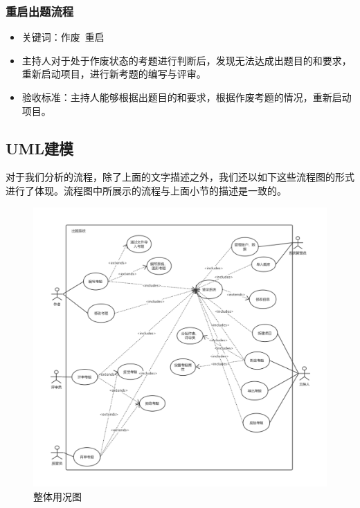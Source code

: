 \documentclass[hyperref, a4paper]{ctexart}
\begin{document}
\hypertarget{ux91cdux542fux51faux9898ux6d41ux7a0b}{%
\subsubsection{重启出题流程}\label{ux91cdux542fux51faux9898ux6d41ux7a0b}}

\begin{itemize}
\item
  关键词：作废~重启
\item
  主持人对于处于作废状态的考题进行判断后，发现无法达成出题目的和要求，重新启动项目，进行新考题的编写与评审。
\item
  验收标准：主持人能够根据出题目的和要求，根据作废考题的情况，重新启动项目。
\end{itemize}

\hypertarget{umlux5efaux6a21}{%
\subsection{UML建模}\label{umlux5efaux6a21}}

对于我们分析的流程，除了上面的文字描述之外，我们还以如下这些流程图的形式进行了体现。流程图中所展示的流程与上面小节的描述是一致的。

\begin{figure}
  \centering
  \includegraphics[scale=0.33]{./assets/usecase_diagram.pdf}
  \caption{整体用况图}\label{1}
\end{figure}
\end{document}
